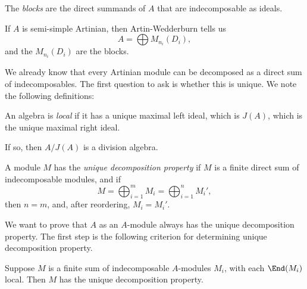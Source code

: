 \documentclass[a4paper]{article}
\begin{document}
\begin{defi}[Block]
  The \emph{blocks} are the direct summands of $A$ that are indecomposable as ideals.
\end{defi}

\begin{eg}
  If $A$ is semi-simple Artinian, then Artin-Wedderburn tells us
  \[
    A = \bigoplus M_{n_i}(D_i),
  \]
  and the $M_{n_i}(D_i)$ are the blocks.
\end{eg}

We already know that every Artinian module can be decomposed as a direct sum of indecomposables. The first question to ask is whether this is unique. We note the following definitions:

\begin{defi}
  An algebra is \emph{local} if it has a unique maximal left ideal, which is $J(A)$, which is the unique maximal right ideal.
\end{defi}
If so, then $A/J(A)$ is a division algebra.

\begin{defi}
  A module $M$ has the \emph{unique decomposition property} if $M$ is a finite direct sum of indecomposable modules, and if
  \[
    M = \bigoplus_{i = 1}^m M_i = \bigoplus_{i = 1}^n M_i',
  \]
  then $n = m$, and, after reordering, $M_i = M_i'$.
\end{defi}

We want to prove that $A$ as an $A$-module always has the unique decomposition property. The first step is the following criterion for determining unique decomposition property.

\begin{thm}
  Suppose $M$ is a finite sum of indecomposable $A$-modules $M_i$, with each $\End(M_i)$ local. Then $M$ has the unique decomposition property.
\end{thm}
\end{document}
